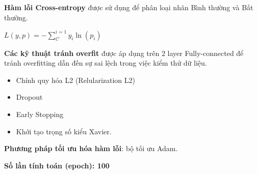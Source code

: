 \textbf{Hàm lỗi Cross-entropy} được sử dụng để phân loại nhãn Bình thường và Bất thường.\par
$L(y,p)=-\sum_{C}^{i=1}y_i\ln(p_i)$\par
\textbf{Các kỹ thuật tránh overfit} được áp dụng trên 2 layer Fully-connected để tránh overfitting dẫn đến sự sai lệch trong việc kiểm thử dữ liệu.
\begin{itemize}
    \item Chính quy hóa L2 (Relularization L2)
    \item Dropout
    \item Early Stopping
    \item Khởi tạo trọng số kiểu Xavier.
\end{itemize}\par
\textbf{Phương pháp tối ưu hóa hàm lỗi}: bộ tối ưu Adam.\par
\textbf{Số lần tính toán (epoch): 100}
